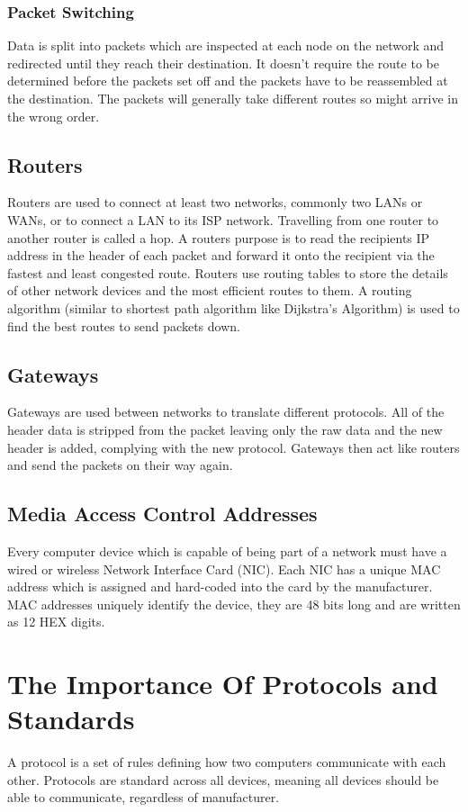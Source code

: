 \documentclass[a4paper,11pt, twocolumn]{article}
\begin{document}
\subsubsection{Packet Switching}
Data is split into packets which are inspected at each node on the network and redirected until they reach their destination. It doesn't require the route to be determined before the packets set off and the packets have to be reassembled at the destination. The packets will generally take different routes so might arrive in the wrong order. 
\subsection{Routers}
Routers are used to connect at least two networks, commonly two LANs or WANs, or to connect a LAN to its ISP network. Travelling from one router to another router is called a hop. A routers purpose is to read the recipients IP address in the header of each packet and forward it onto the recipient via the fastest and least congested route. Routers use routing tables to store the details of other network devices and the most efficient routes to them. A routing algorithm (similar to shortest path algorithm like Dijkstra's Algorithm) is used to find the best routes to send packets down.
\subsection{Gateways}
Gateways are used between networks to translate different protocols. All of the header data is stripped from the packet leaving only the raw data and the new header is added, complying with the new protocol. Gateways then act like routers and send the packets on their way again.
\subsection{Media Access Control Addresses}
Every computer device which is capable of being part of a network must have a wired or wireless Network Interface Card (NIC). Each NIC has a unique MAC address which is assigned and hard-coded into the card by the manufacturer. MAC addresses uniquely identify the device, they are 48 bits long and are written as 12 HEX digits.

\section{The Importance Of Protocols and Standards}
A protocol is a set of rules defining how two computers communicate with each other. Protocols are standard across all devices, meaning all devices should be able to communicate, regardless of manufacturer.
\end{document}
